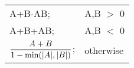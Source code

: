 \begin{tabular}{ll}
A+B-AB;     & A,B $>$ 0     \\
A+B+AB;     & A,B $<$ 0     \\
$\dfrac {A + B} {1 - \textup{min}( \lvert A \rvert, \lvert B \rvert )}$; & otherwise \\
\end{tabular}

